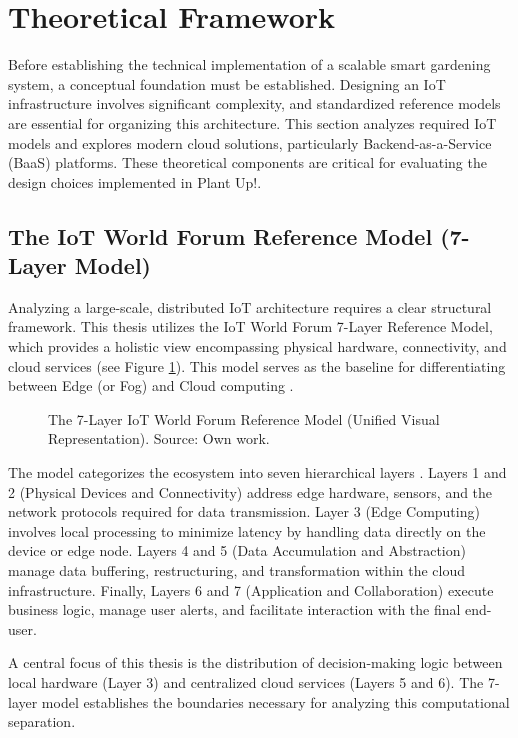 \section{Theoretical Framework}
Before establishing the technical implementation of a scalable smart gardening system, a conceptual foundation must be established. Designing an IoT infrastructure involves significant complexity, and standardized reference models are essential for organizing this architecture. This section analyzes required IoT models and explores modern cloud solutions, particularly Backend-as-a-Service (BaaS) platforms. These theoretical components are critical for evaluating the design choices implemented in Plant Up!.

\subsection{The IoT World Forum Reference Model (7-Layer Model)}

Analyzing a large-scale, distributed IoT architecture requires a clear structural framework. This thesis utilizes the IoT World Forum 7-Layer Reference Model, which provides a holistic view encompassing physical hardware, connectivity, and cloud services (see Figure \ref{fig:iot_reference_model}). This model serves as the baseline for differentiating between Edge (or Fog) and Cloud computing \cite{iot_reference_model}.

\begin{figure}[H]
    \centering
    \caption{The 7-Layer IoT World Forum Reference Model (Unified Visual Representation). Source: Own work.}
    \label{fig:iot_reference_model}
\end{figure}

The model categorizes the ecosystem into seven hierarchical layers \cite{iot_reference_model}. Layers 1 and 2 (Physical Devices and Connectivity) address edge hardware, sensors, and the network protocols required for data transmission. Layer 3 (Edge Computing) involves local processing to minimize latency by handling data directly on the device or edge node. Layers 4 and 5 (Data Accumulation and Abstraction) manage data buffering, restructuring, and transformation within the cloud infrastructure. Finally, Layers 6 and 7 (Application and Collaboration) execute business logic, manage user alerts, and facilitate interaction with the final end-user.

A central focus of this thesis is the distribution of decision-making logic between local hardware (Layer 3) and centralized cloud services (Layers 5 and 6). The 7-layer model establishes the boundaries necessary for analyzing this computational separation.

